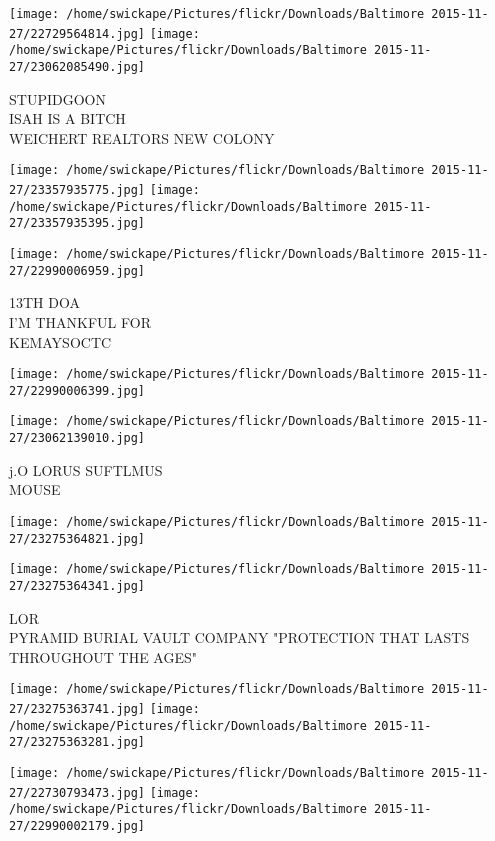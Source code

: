 \documentclass[10pt,letterpaper]{article}
\begin{document}
\vspace{0.25in}
\texttt{[image: /home/swickape/Pictures/flickr/Downloads/Baltimore 2015-11-27/22729564814.jpg]}
\texttt{[image: /home/swickape/Pictures/flickr/Downloads/Baltimore 2015-11-27/23062085490.jpg]}

STUPIDGOON\\
ISAH IS A BITCH\\
WEICHERT REALTORS NEW COLONY
\pagebreak

\texttt{[image: /home/swickape/Pictures/flickr/Downloads/Baltimore 2015-11-27/23357935775.jpg]}
\texttt{[image: /home/swickape/Pictures/flickr/Downloads/Baltimore 2015-11-27/23357935395.jpg]}

\vspace{0.25in}
\texttt{[image: /home/swickape/Pictures/flickr/Downloads/Baltimore 2015-11-27/22990006959.jpg]}

13TH DOA\\
I'M THANKFUL FOR\\
KEMAYSOCTC
\pagebreak

\texttt{[image: /home/swickape/Pictures/flickr/Downloads/Baltimore 2015-11-27/22990006399.jpg]}

\vspace{0.25in}
\texttt{[image: /home/swickape/Pictures/flickr/Downloads/Baltimore 2015-11-27/23062139010.jpg]}

j.O LORUS SUFTLMUS\\
MOUSE
\pagebreak

\texttt{[image: /home/swickape/Pictures/flickr/Downloads/Baltimore 2015-11-27/23275364821.jpg]}

\vspace{0.25in}
\texttt{[image: /home/swickape/Pictures/flickr/Downloads/Baltimore 2015-11-27/23275364341.jpg]}

LOR\\
PYRAMID BURIAL VAULT COMPANY "PROTECTION THAT LASTS THROUGHOUT THE AGES"
\pagebreak

\texttt{[image: /home/swickape/Pictures/flickr/Downloads/Baltimore 2015-11-27/23275363741.jpg]}
\texttt{[image: /home/swickape/Pictures/flickr/Downloads/Baltimore 2015-11-27/23275363281.jpg]}

\texttt{[image: /home/swickape/Pictures/flickr/Downloads/Baltimore 2015-11-27/22730793473.jpg]}
\texttt{[image: /home/swickape/Pictures/flickr/Downloads/Baltimore 2015-11-27/22990002179.jpg]}
\end{document}
